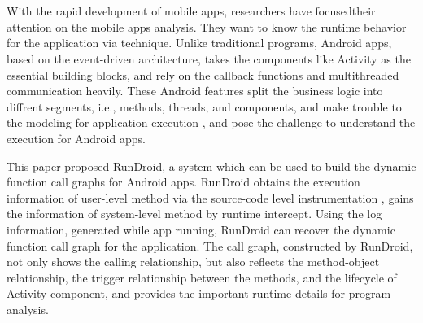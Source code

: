 \newpage



\chapter*{}




With the rapid development of mobile apps, researchers have focusedtheir attention on the mobile apps analysis.
They want to know the runtime behavior for the application via technique.
Unlike traditional programs, Android apps, based on the  event-driven architecture,  takes the components like Activity as  the essential building blocks, and  rely on the callback functions and multithreaded communication heavily.
These Android features split the business logic into diffrent segments, i.e., methods, threads, and components,  and make trouble to the modeling for application execution , and  pose the challenge to understand the execution for Android apps.





This paper proposed  RunDroid, a system which can be used to build the dynamic function call graphs for Android apps.
RunDroid obtains  the execution information of user-level method via  the source-code level instrumentation ,
gains the information of system-level method by runtime intercept.
Using the log information, generated while app running, RunDroid can recover the dynamic function call graph for the application.
The call graph, constructed by RunDroid, not only shows the calling relationship, but also reflects the method-object relationship, the trigger relationship between the methods, and the lifecycle of  Activity component, 
and provides the important runtime details for program analysis.





